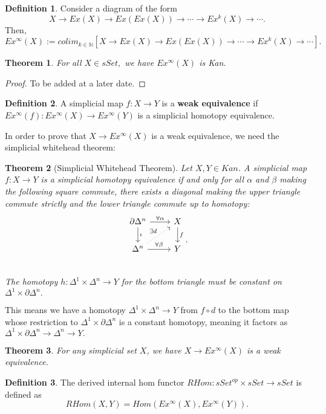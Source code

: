 \documentclass{article}
\newtheorem{theorem}{Theorem}[section]
\theoremstyle{definition}
\newtheorem{defn}{Definition}[section]
\newcommand{\N}{\mathbb{N}}
\begin{document}
\begin{defn}
Consider a diagram of the form 
\[X\rightarrow Ex(X)\rightarrow Ex(Ex(X))\rightarrow \cdots\rightarrow Ex^{k}(X)\rightarrow\cdots. \] Then,
\[Ex^{\infty}(X):= colim_{k\in\N}[X\rightarrow Ex(X)\rightarrow Ex(Ex(X))\rightarrow \cdots\rightarrow Ex^{k}(X)\rightarrow\cdots]. \] 
\end{defn}
\begin{theorem}
For all $X\in sSet,$ we have $Ex^{\infty}(X)$ is Kan. 
\end{theorem}
\begin{proof}
To be added at a later date.
\end{proof}
\begin{defn}
A simplicial map $f:X\rightarrow Y$ is a \textbf{weak equivalence} if $Ex^{\infty}(f):Ex^{\infty}(X)\rightarrow Ex^{\infty}(Y)$ is a simplicial homotopy equivalence. 
\end{defn}

In order to prove that $X\rightarrow Ex^{\infty}(X)$ is a weak equivalence, we need the simplicial whitehead theorem:
\begin{theorem}[Simplicial Whitehead Theorem]
Let $X,Y\in Kan$. A simplicial map $f:X\rightarrow Y$ is a simplicial homotopy equivalence if and only for all $\alpha$ and $\beta$ making the following square commute, there exists a diagonal making the upper triangle commute strictly and the lower triangle commute up to homotopy:
\[
\begin{tikzcd}
\partial\Delta^{n}\arrow[d,"\iota"]\arrow[r,"\forall\alpha"] & X\arrow[d,"f"]\\
\Delta^{n}\arrow[r,"\forall\beta"]\arrow[ur,"\exists d",dotted] & Y\\
\end{tikzcd}.
\]
The homotopy $h:\Delta^{1}\times\Delta^{n}\rightarrow Y$ for the bottom triangle must be constant on $\Delta^{1}\times\partial\Delta^{n}.$
\end{theorem}
This means we have a homotopy $\Delta^{1}\times\Delta^{n}\rightarrow Y$ from $f\circ d$ to the bottom map whose restriction to $\Delta^{1}\times\partial\Delta^{n}$ is a constant homotopy, meaning it factors as\\ $\Delta^{1}\times\partial\Delta^{n}\rightarrow\Delta^{n}\rightarrow Y.$
\begin{theorem}
For any simplicial set $X$, we have $X\rightarrow Ex^{\infty}(X)$ is a weak equivalence.
\end{theorem}
\begin{defn}
The derived internal hom functor $RHom:sSet^{op}\times sSet\rightarrow sSet$ is defined as 
\[RHom(X,Y)=Hom(Ex^{\infty}(X),Ex^{\infty}(Y)).\]
\end{defn}
\end{document}
